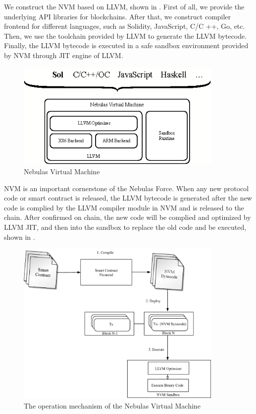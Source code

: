 We construct the NVM based on LLVM, shown in . First
of all, we provide the underlying API libraries for blockchains. After that, we
construct compiler frontend for different languages, such as Solidity,
JavaScript, C/C ++, Go, etc. Then, we use the toolchain provided by LLVM to
generate the LLVM bytecode. Finally, the LLVM bytecode is executed in a safe
sandbox environment provided by NVM through JIT engine of LLVM.


\begin{figure}[h]
\centering
\includegraphics[width=10cm]{./figs/nvm}
\caption{Nebulas Virtual Machine}
\label{fig:nvm}
\end{figure}

NVM is an important cornerstone of the Nebulas Force. When any new protocol
code or smart contract is released, the LLVM bytecode is generated after the
new code is complied by the LLVM compiler module in NVM and is released to the
chain. After confirmed on chain, the new code will be complied and
optimized by LLVM JIT, and then into the sandbox to replace the old code and
be executed, shown in .


\begin{figure}[h]
\centering
\includegraphics[width=10cm]{./figs/nvm-process}
\caption{The operation mechanism of the Nebulas Virtual Machine}
\label{fig:nvm-process}
\end{figure}

